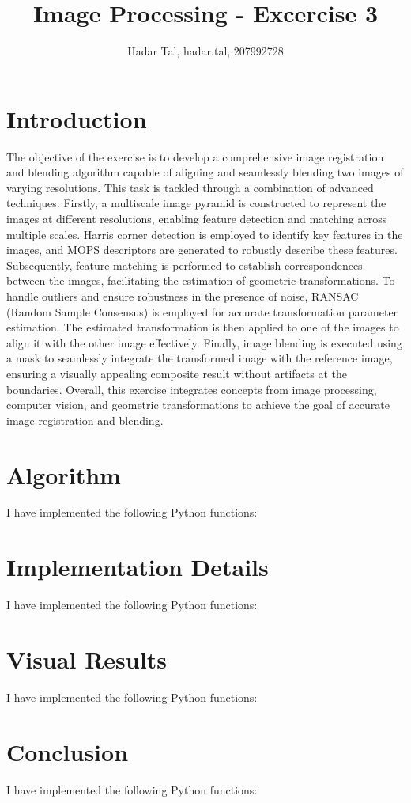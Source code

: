 \documentclass[a4paper, 12pt]{article}
\title{Image Processing - Excercise 3}
\author{Hadar Tal, hadar.tal, 207992728}
\begin{document}
\maketitle

\section*{Introduction}

The objective of the exercise is to develop a comprehensive image registration and blending algorithm 
capable of aligning and seamlessly blending two images of varying resolutions. 
This task is tackled through a combination of advanced techniques. 
Firstly, a multiscale image pyramid is constructed to represent the images at different resolutions, 
enabling feature detection and matching across multiple scales. 
Harris corner detection is employed to identify key features in the images, 
and MOPS descriptors are generated to robustly describe these features. 
Subsequently, feature matching is performed to establish correspondences between the images, 
facilitating the estimation of geometric transformations. 
To handle outliers and ensure robustness in the presence of noise, RANSAC (Random Sample Consensus) 
is employed for accurate transformation parameter estimation. 
The estimated transformation is then applied to one of the images to align it with the other image effectively. 
Finally, image blending is executed using a mask to seamlessly integrate the transformed image with the reference image, 
ensuring a visually appealing composite result without artifacts at the boundaries. 
Overall, this exercise integrates concepts from image processing, computer vision, 
and geometric transformations to achieve the goal of accurate image registration and blending.






\section*{Algorithm}

I have implemented the following Python functions:

\section*{Implementation Details}

I have implemented the following Python functions:

\section*{Visual Results}

I have implemented the following Python functions:

\section*{Conclusion}

I have implemented the following Python functions:
\end{document}
